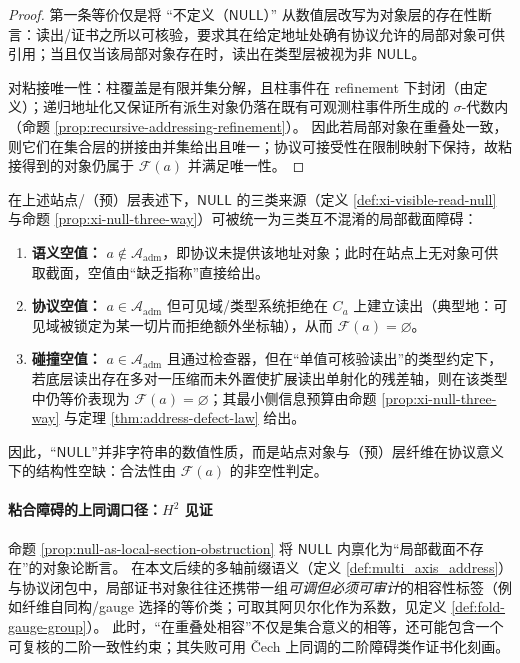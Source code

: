 \begin{proof}
第一条等价仅是将 “不定义（\(\mathsf{NULL}\)）” 从数值层改写为对象层的存在性断言：读出/证书之所以可核验，要求其在给定地址处确有协议允许的局部对象可供引用；当且仅当该局部对象存在时，读出在类型层被视为非 \(\mathsf{NULL}\)。
\par
对粘接唯一性：柱覆盖是有限并集分解，且柱事件在 refinement 下封闭（由定义）；递归地址化又保证所有派生对象仍落在既有可观测柱事件所生成的 \(\sigma\)-代数内（命题 \ref{prop:recursive-addressing-refinement}）。
因此若局部对象在重叠处一致，则它们在集合层的拼接由并集给出且唯一；协议可接受性在限制映射下保持，故粘接得到的对象仍属于 \(\mathscr{F}(a)\) 并满足唯一性。
\end{proof}

\begin{corollary}\label{cor:null-trichotomy-local-section}
在上述站点/（预）层表述下，\(\mathsf{NULL}\) 的三类来源（定义 \ref{def:xi-visible-read-null} 与命题 \ref{prop:xi-null-three-way}）可被统一为三类互不混淆的局部截面障碍：
\begin{enumerate}
  \item \textbf{语义空值：} \(a\notin\mathcal{A}_{\mathrm{adm}}\)，即协议未提供该地址对象；此时在站点上无对象可供取截面，空值由“缺乏指称”直接给出。
  \item \textbf{协议空值：} \(a\in\mathcal{A}_{\mathrm{adm}}\) 但可见域/类型系统拒绝在 \(C_a\) 上建立读出（典型地：可见域被锁定为某一切片而拒绝额外坐标轴），从而 \(\mathscr{F}(a)=\varnothing\)。
  \item \textbf{碰撞空值：} \(a\in\mathcal{A}_{\mathrm{adm}}\) 且通过检查器，但在“单值可核验读出”的类型约定下，若底层读出存在多对一压缩而未外置使扩展读出单射化的残差轴，则在该类型中仍等价表现为 \(\mathscr{F}(a)=\varnothing\)；其最小侧信息预算由命题 \ref{prop:xi-null-three-way} 与定理 \ref{thm:address-defect-law} 给出。
\end{enumerate}
因此，“\(\mathsf{NULL}\)”并非字符串的数值性质，而是站点对象与（预）层纤维在协议意义下的结构性空缺：合法性由 \(\mathscr{F}(a)\) 的非空性判定。
\end{corollary}

\paragraph{粘合障碍的上同调口径：\texorpdfstring{$H^2$}{H2} 见证}
命题 \ref{prop:null-as-local-section-obstruction} 将 \(\mathsf{NULL}\) 内禀化为“局部截面不存在”的对象论断言。
在本文后续的多轴前缀语义（定义 \ref{def:multi_axis_address}）与协议闭包中，局部证书对象往往还携带一组\emph{可调但必须可审计}的相容性标签（例如纤维自同构/gauge 选择的等价类；可取其阿贝尔化作为系数，见定义 \ref{def:fold-gauge-group}）。
此时，“在重叠处相容”不仅是集合意义的相等，还可能包含一个可复核的二阶一致性约束；其失败可用 Čech 上同调的二阶障碍类作证书化刻画。

